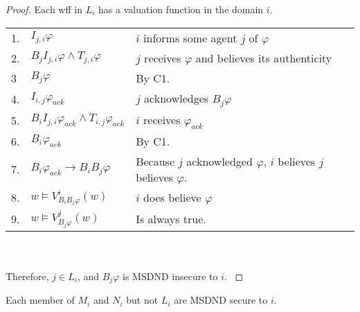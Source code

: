 \begin{proof}
Each wff in $L_i$ has a valuation function in the domain $i$.

\begin{table}[H]
\centering
\small
\begin{tabularx}{\linewidth}{l l X}
1. & $I_{j,i} \varphi$ & $i$ informs some agent $j$ of $\varphi$ \\
2. & $B_{j}I_{j,i} \varphi \wedge T_{j,i} \varphi$ & $j$ receives $\varphi$ and believes its authenticity \\
3  & $B_j \varphi$ & By C1. \\
4. & $I_{i,j} \varphi_{ack}$ & $j$ acknowledges $B_j \varphi$ \\
5. & $B_{i}I_{j,i} \varphi_{ack} \wedge T_{i,j} \varphi_{ack}$ & $i$ receives $\varphi_{ack}$ \\
6. & $B_{i} \varphi_{ack}$ & By C1. \\
7. & $B_{i} \varphi_{ack} \rightarrow B_i B_j \varphi$ & Because $j$ acknowledged $\varphi$, $i$ believes $j$ believes $\varphi$. \\
8. & $w \vDash V_{B_i B_j \varphi}^{i}(w)$ & $i$ does believe $\varphi$ \\
9. & $w \vDash V_{B_j \varphi}^{j}(w)$ & Is always true. %
\end{tabularx} \\~\\
Therefore, $j \in L_i$, and $B_j \varphi$ is MSDND insecure to $i$.
\label{tab:lsetsecurity}
\end{table}
\end{proof}

\begin{thm}
Each member of $M_i$ and $N_i$ but not $L_i$ are MSDND secure to $i$.
\end{thm}

